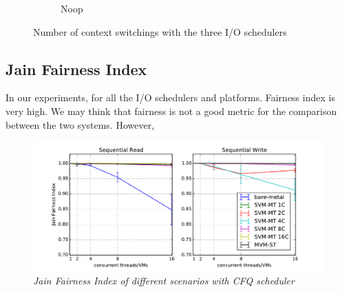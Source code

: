 \documentclass{acmsig}
\begin{document}
\begin{figure}[t]
\begin{subfigure}[b]{0.3\textwidth}
     \caption{Noop}
     \label{fig:contextswitching_noop_write}
   \end{subfigure}
   \caption{Number of context switchings with the three I/O schedulers}\label{fig:contextswitching}
\end{figure}

\subsection{Jain Fairness Index}
In our experiments, for all the I/O schedulers and platforms. Fairness index is very high. We may think that fairness is not a good metric for the comparison between the two systems. However,
\begin{figure}[t]
  \includegraphics[scale=0.85]{figures/JFI.pdf}
  \caption{\textit{Jain Fairness Index of different scenarios with CFQ scheduler}}
  \label{fig:jfi}
\end{figure}







\end{document}
